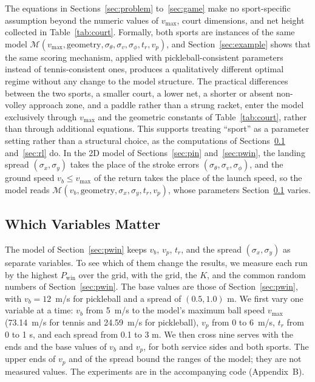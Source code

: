   The equations in Sections~\ref{sec:problem} to~\ref{sec:game} make no
  sport-specific assumption beyond the numeric values of $v_{\max}$, court
  dimensions, and net height collected in Table~\ref{tab:court}. Formally, both
  sports are instances of the same model $\mathcal{M}(v_{\max},
  \text{geometry}, \sigma_\theta, \sigma_v, \sigma_\phi, t_r, v_p)$, and
  Section~\ref{sec:example} shows that the same scoring mechanism, applied with
  pickleball-consistent parameters instead of tennis-consistent ones, produces
  a qualitatively different optimal regime without any change to the model
  structure. The practical differences between the two sports, a smaller court,
  a lower net, a shorter or absent non-volley approach zone, and a paddle
  rather than a strung racket, enter the model exclusively through $v_{\max}$
  and the geometric constants of Table~\ref{tab:court}, rather than through
  additional equations. This supports treating ``sport'' as a parameter setting
  rather than a structural choice, as the computations of
  Sections~\ref{sec:variables} and~\ref{sec:rl} do. In the 2D model of
  Sections~\ref{sec:pin} and~\ref{sec:pwin}, the landing spread $(\sigma_x,
  \sigma_y)$ takes the place of the stroke errors $(\sigma_\theta, \sigma_v,
  \sigma_\phi)$, and the ground speed $v_b \le v_{\max}$ of the return takes
  the place of the launch speed, so the model reads $\mathcal{M}(v_b,
  \text{geometry}, \sigma_x, \sigma_y, t_r, v_p)$, whose parameters
  Section~\ref{sec:variables} varies.

  \subsection{Which Variables Matter}\label{sec:variables}

  The model of Section~\ref{sec:pwin} keeps $v_b$, $v_p$, $t_r$, and the spread
  $(\sigma_x, \sigma_y)$ as separate variables. To see which of them change the
  results, we measure each run by the highest $P_{\mathrm{win}}$ over the grid,
  with the grid, the $K$, and the common random numbers of
  Section~\ref{sec:pwin}. The base values are those of Section~\ref{sec:pwin},
  with $v_b = 12$~m/s for pickleball and a spread of $(0.5, 1.0)$ m. We first
  vary one variable at a time: $v_b$ from 5~m/s to the model's maximum ball
  speed $v_{\max}$ (73.14~m/s for tennis and 24.59~m/s for pickleball), $v_p$
  from 0 to 6~m/s, $t_r$ from 0 to 1 s, and each spread from 0.1 to 3 m. We then
  cross nine serves with the ends and the base values of $v_b$ and $v_p$, for
  both service sides and both sports. The upper ends of $v_p$ and of the spread
  bound the ranges of the model; they are not measured values. The experiments
  are in the accompanying code (Appendix~B).


